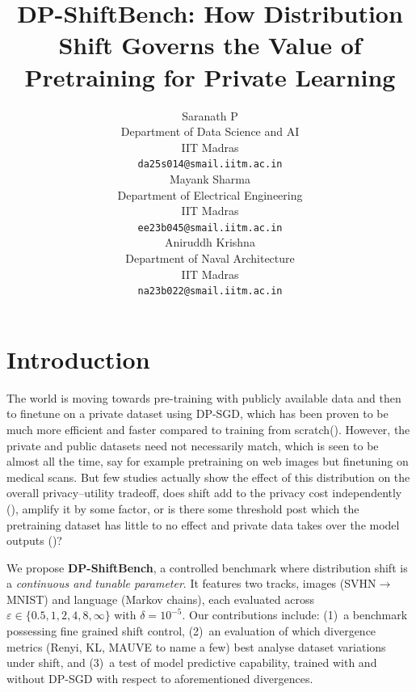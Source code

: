 \documentclass{article}
\title{DP-ShiftBench: How Distribution Shift Governs the Value of Pretraining for Private Learning}
\author{
  Saranath P \\
  Department of Data Science and AI\\
  IIT Madras\\
  \texttt{da25s014@smail.iitm.ac.in} \\
  \And
  Mayank Sharma \\
  Department of Electrical Engineering\\
  IIT Madras\\
  \texttt{ee23b045@smail.iitm.ac.in} \\
  \And
  Aniruddh Krishna \\
  Department of Naval Architecture\\
  IIT Madras\\
  \texttt{na23b022@smail.iitm.ac.in} \\
}
\begin{document}
\maketitle

\section{Introduction}


 The world is moving towards pre-training with publicly available data and then to finetune on a private dataset using DP-SGD, which has been proven to be much more efficient and faster compared to training from scratch(\cite{li2022large, ganesh2023why, de2022unlocking}). However, the private and public datasets need not necessarily match, which is seen to be almost all the time, say for example pretraining on web images but finetuning on medical scans. But few studies actually show the effect of this distribution on the overall privacy--utility tradeoff, does shift add to the privacy cost independently (\cite{bassily2023dp}), amplify it by some factor, or is there some threshold post which the pretraining dataset has little to no effect and private data takes over the model outputs (\cite{setlur2025lower})?

We propose \textbf{DP-ShiftBench}, a controlled benchmark where distribution shift is a \emph{continuous and tunable parameter}. It features two tracks, images (SVHN$\rightarrow$MNIST) and language (Markov chains), each evaluated across $\varepsilon \in \{0.5, 1, 2, 4, 8, \infty\}$ with $\delta = 10^{-5}$. Our contributions include: (1)~a benchmark possessing fine grained shift control, (2)~an evaluation of which divergence metrics (Renyi, KL, MAUVE \cite{pillutla2023mauve} to name a few) best analyse dataset variations under shift, and (3)~a test of model predictive capability, trained with and without DP-SGD with respect to aforementioned divergences.

\end{document}
